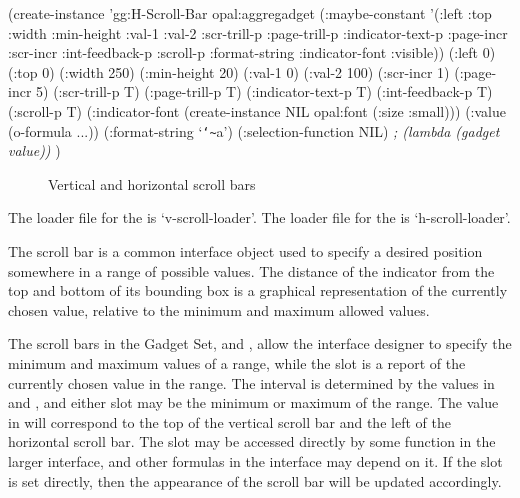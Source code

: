 \begin{programexample}
\begin{group}
(create-instance 'gg:H-Scroll-Bar opal:aggregadget
   (:maybe-constant '(:left :top :width :min-height :val-1 :val-2 :scr-trill-p
                      :page-trill-p :indicator-text-p :page-incr :scr-incr
                      :int-feedback-p :scroll-p :format-string :indicator-font :visible))
   (:left 0)
   (:top 0)
   (:width 250)
   (:min-height 20)
   (:val-1 0)
   (:val-2 100)
   (:scr-incr 1)
   (:page-incr 5)
   (:scr-trill-p T)
   (:page-trill-p T)
   (:indicator-text-p T)
   (:int-feedback-p T)
   (:scroll-p T)
   (:indicator-font (create-instance NIL opal:font (:size :small)))
   (:value (o-formula ...))
   (:format-string `{\tt\char`\~}a')
   (:selection-function NIL)   {\it ; (lambda (gadget value))}
   )
\end{group}
\end{programexample}

\begin{figure}
\begin{center}
\end{center}
\caption{Vertical and horizontal scroll bars}
\end{figure}

The loader file for the  is `v-scroll-loader'.  The
loader file for the  is `h-scroll-loader'.

The scroll bar is a common interface object used to specify a desired
position somewhere in a range of possible values.  The distance of the
indicator from the top and bottom of its bounding box is a graphical
representation of the currently chosen value, relative to the minimum
and maximum allowed values.

The scroll bars in the Gadget Set,  and
, allow the interface designer to specify the minimum
and maximum values of a range, while the  slot is a report
of the currently chosen value in the range.  The interval is
determined by the values in  and , and either
slot may be the minimum or maximum of the range.  The value in
 will correspond to the top of the vertical scroll bar and
the left of the horizontal scroll bar.  The  slot may be
accessed directly by some function in the larger interface, and other
formulas in the interface may depend on it.  If the  slot
is set directly, then the appearance of the scroll bar will be updated
accordingly.


